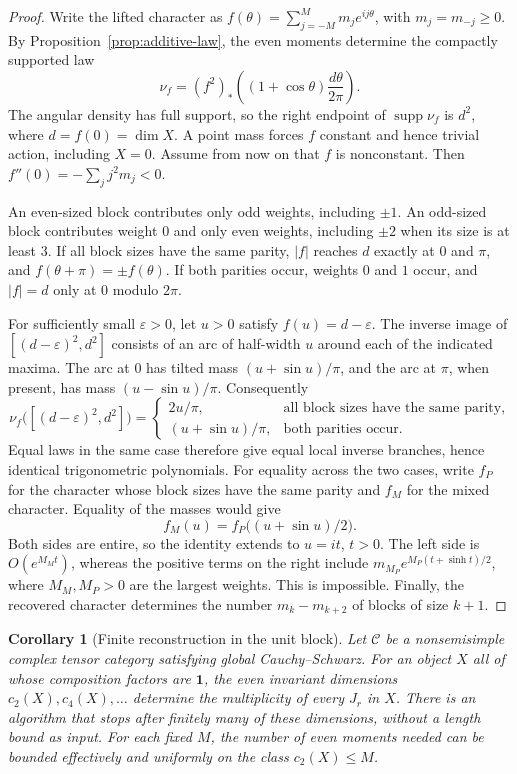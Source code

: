 \documentclass[11pt,reqno]{amsart}
\newtheorem{corollary}[theorem]{Corollary}
\theoremstyle{definition}
\newcommand{\one}{\mathbf 1}
\newcommand{\C}{\mathcal C}
\DeclareMathOperator{\supp}{supp}
\begin{document}
\begin{proof}
Write the lifted character as $f(\theta)=\sum_{j=-M}^M m_j e^{ij\theta}$, with $m_j=m_{-j}\geq0$. By Proposition~\ref{prop:additive-law}, the even moments determine the compactly supported law
\[
 \nu_f=(f^2)_*\!\left((1+\cos\theta)\frac{d\theta}{2\pi}\right).
\]
The angular density has full support, so the right endpoint of $\supp\nu_f$ is $d^2$, where $d=f(0)=\dim X$. A point mass forces $f$ constant and hence trivial action, including $X=0$. Assume from now on that $f$ is nonconstant. Then $f''(0)=-\sum_jj^2m_j<0$.

An even-sized block contributes only odd weights, including $\pm1$. An odd-sized block contributes weight $0$ and only even weights, including $\pm2$ when its size is at least $3$. If all block sizes have the same parity, $|f|$ reaches $d$ exactly at $0$ and $\pi$, and $f(\theta+\pi)=\pm f(\theta)$. If both parities occur, weights $0$ and $1$ occur, and $|f|=d$ only at $0$ modulo $2\pi$.

For sufficiently small $\varepsilon>0$, let $u>0$ satisfy $f(u)=d-\varepsilon$. The inverse image of $[(d-\varepsilon)^2,d^2]$ consists of an arc of half-width $u$ around each of the indicated maxima. The arc at $0$ has tilted mass $(u+\sin u)/\pi$, and the arc at $\pi$, when present, has mass $(u-\sin u)/\pi$. Consequently
\[
 \nu_f\bigl([(d-\varepsilon)^2,d^2]\bigr)=
 \begin{cases}
 2u/\pi,&\text{all block sizes have the same parity},\\
 (u+\sin u)/\pi,&\text{both parities occur}.
 \end{cases}
\]
Equal laws in the same case therefore give equal local inverse branches, hence identical trigonometric polynomials. For equality across the two cases, write $f_P$ for the character whose block sizes have the same parity and $f_M$ for the mixed character. Equality of the masses would give
\[
 f_M(u)=f_P\bigl((u+\sin u)/2\bigr).
\]
Both sides are entire, so the identity extends to $u=it$, $t>0$. The left side is $O(e^{M_Mt})$, whereas the positive terms on the right include $m_{M_P}e^{M_P(t+\sinh t)/2}$, where $M_M,M_P>0$ are the largest weights. This is impossible. Finally, the recovered character determines the number $m_k-m_{k+2}$ of blocks of size $k+1$.
\end{proof}

\begin{corollary}[Finite reconstruction in the unit block]\label{cor:finite-reconstruction}
Let $\C$ be a nonsemisimple complex tensor category satisfying global Cauchy--Schwarz. For an object $X$ all of whose composition factors are $\one$, the even invariant dimensions $c_2(X),c_4(X),\ldots$ determine the multiplicity of every $J_r$ in $X$. There is an algorithm that stops after finitely many of these dimensions, without a length bound as input. For each fixed $M$, the number of even moments needed can be bounded effectively and uniformly on the class $c_2(X)\le M$.
\end{corollary}
\end{document}
